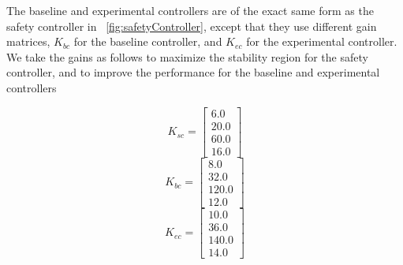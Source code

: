 \documentclass[conference]{IEEEtran}
\begin{document}
The baseline and experimental controllers are of the exact same form as the safety controller in ~\ref{fig:safetyController}, except that they use different gain matrices, $K_{bc}$ for the baseline controller, and $K_{ec}$ for the experimental controller.  We take the gains as follows to maximize the stability region for the safety controller, and to improve the performance for the baseline and experimental controllers

\begin{equation}
K_{sc}=\left[\begin{array}{c}6.0\\ 20.0\\ 60.0\\ 16.0\end{array}\right]
\end{equation}
\begin{equation}
K_{bc}=\left[\begin{array}{c}8.0\\ 32.0\\ 120.0\\ 12.0\end{array}\right]
\end{equation}
\begin{equation}
K_{ec}=\left[\begin{array}{c}10.0\\ 36.0\\ 140.0\\ 14.0\end{array}\right]
\end{equation}

%
%
%
\end{document}
